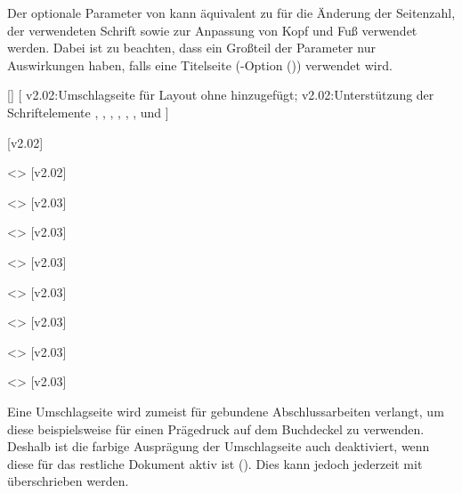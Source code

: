 \begin{DeclareEntity*}{}
\begin{DeclareEntity*}{}
\begin{DeclareEntity*}{}
\begin{Declaration}
Der optionale Parameter von  kann äquivalent zu 
 für die Änderung der Seitenzahl, der verwendeten Schrift 
sowie zur Anpassung von Kopf und Fuß verwendet werden. Dabei ist zu beachten, 
dass ein Großteil der Parameter nur Auswirkungen haben, falls eine Titelseite
(\KOMAScript-Option ()) verwendet 
wird.
\end{Declaration}

\begin{Declaration}
  {[]}
[%
  v2.02:Umschlagseite für Layout ohne \noexpand\CD hinzugefügt;%
  v2.02:Unterstützung der Schriftelemente , 
    , , , , 
    ,  und %
]
\begin{Declaration}
  {}
  [v2.02]
\begin{Declaration}
  {}
\begin{Declaration}
  {}
  <>
  [v2.02]
\begin{Declaration}
  {}
  <>
  [v2.03]
\begin{Declaration}
  {}
  <>
  [v2.03]
\begin{Declaration}
  {}
  <>
  [v2.03]
\begin{Declaration}
  {}
  <>
  [v2.03]
\begin{Declaration}
  {}
  <>
  [v2.03]
\begin{Declaration}
  {}
  <>
  [v2.03]
\begin{Declaration}
  {}
  <>
  [v2.03]
\printdeclarationlist[Umschlagseite|!]

Eine Umschlagseite wird zumeist für gebundene Abschlussarbeiten verlangt, um 
diese beispielsweise für einen Prägedruck auf dem Buchdeckel zu verwenden. 
Deshalb ist die farbige Ausprägung der Umschlagseite auch deaktiviert, wenn 
diese für das restliche Dokument aktiv ist (). Dies kann 
jedoch jederzeit mit  überschrieben werden.


\end{Declaration}
\end{Declaration}
\end{Declaration}
\end{Declaration}
\end{Declaration}
\end{Declaration}
\end{Declaration}
\end{Declaration}
\end{Declaration}
\end{Declaration}
\end{Declaration}
\end{DeclareEntity*}
\end{DeclareEntity*}
\end{DeclareEntity*}
